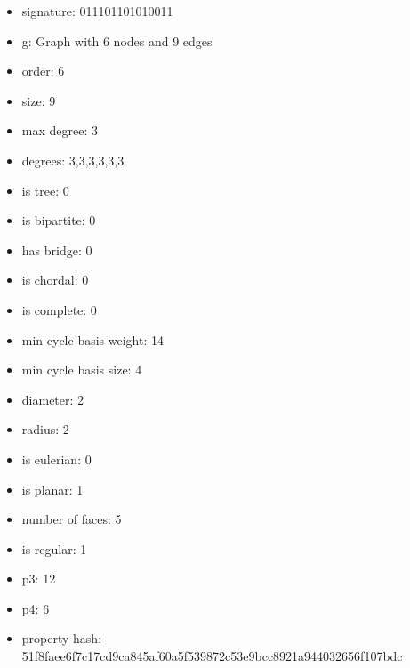 \begin{itemize}
\item signature: 011101101010011
\item g: Graph with 6 nodes and 9 edges
\item order: 6
\item size: 9
\item max degree: 3
\item degrees: 3,3,3,3,3,3
\item is tree: 0
\item is bipartite: 0
\item has bridge: 0
\item is chordal: 0
\item is complete: 0
\item min cycle basis weight: 14
\item min cycle basis size: 4
\item diameter: 2
\item radius: 2
\item is eulerian: 0
\item is planar: 1
\item number of faces: 5
\item is regular: 1
\item p3: 12
\item p4: 6
\item property hash: 51f8faee6f7c17cd9ca845af60a5f539872c53e9bcc8921a944032656f107bdc
\end{itemize}
\newpage
\begin{figure}
\end{figure}
